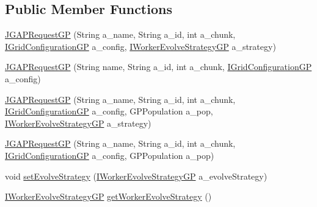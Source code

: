\subsection*{Public Member Functions}
\begin{DoxyCompactItemize}
\item 
\hyperlink{classorg_1_1jgap_1_1distr_1_1grid_1_1gp_1_1_j_g_a_p_request_g_p_a02c03575aab60b0a8100308c916efdc9}{J\-G\-A\-P\-Request\-G\-P} (String a\-\_\-name, String a\-\_\-id, int a\-\_\-chunk, \hyperlink{interfaceorg_1_1jgap_1_1distr_1_1grid_1_1gp_1_1_i_grid_configuration_g_p}{I\-Grid\-Configuration\-G\-P} a\-\_\-config, \hyperlink{interfaceorg_1_1jgap_1_1distr_1_1grid_1_1gp_1_1_i_worker_evolve_strategy_g_p}{I\-Worker\-Evolve\-Strategy\-G\-P} a\-\_\-strategy)
\item 
\hyperlink{classorg_1_1jgap_1_1distr_1_1grid_1_1gp_1_1_j_g_a_p_request_g_p_a134870375b9ef654b7f50c7ddd283c67}{J\-G\-A\-P\-Request\-G\-P} (String name, String a\-\_\-id, int a\-\_\-chunk, \hyperlink{interfaceorg_1_1jgap_1_1distr_1_1grid_1_1gp_1_1_i_grid_configuration_g_p}{I\-Grid\-Configuration\-G\-P} a\-\_\-config)
\item 
\hyperlink{classorg_1_1jgap_1_1distr_1_1grid_1_1gp_1_1_j_g_a_p_request_g_p_a01091ecbec4aacf0d3ca8c3abaf9575a}{J\-G\-A\-P\-Request\-G\-P} (String a\-\_\-name, String a\-\_\-id, int a\-\_\-chunk, \hyperlink{interfaceorg_1_1jgap_1_1distr_1_1grid_1_1gp_1_1_i_grid_configuration_g_p}{I\-Grid\-Configuration\-G\-P} a\-\_\-config, G\-P\-Population a\-\_\-pop, \hyperlink{interfaceorg_1_1jgap_1_1distr_1_1grid_1_1gp_1_1_i_worker_evolve_strategy_g_p}{I\-Worker\-Evolve\-Strategy\-G\-P} a\-\_\-strategy)
\item 
\hyperlink{classorg_1_1jgap_1_1distr_1_1grid_1_1gp_1_1_j_g_a_p_request_g_p_a2d906bea212b3ead43ac86c5bce543bc}{J\-G\-A\-P\-Request\-G\-P} (String a\-\_\-name, String a\-\_\-id, int a\-\_\-chunk, \hyperlink{interfaceorg_1_1jgap_1_1distr_1_1grid_1_1gp_1_1_i_grid_configuration_g_p}{I\-Grid\-Configuration\-G\-P} a\-\_\-config, G\-P\-Population a\-\_\-pop)
\item 
void \hyperlink{classorg_1_1jgap_1_1distr_1_1grid_1_1gp_1_1_j_g_a_p_request_g_p_aa383bac5359580a0fa62b7ad6d337a07}{set\-Evolve\-Strategy} (\hyperlink{interfaceorg_1_1jgap_1_1distr_1_1grid_1_1gp_1_1_i_worker_evolve_strategy_g_p}{I\-Worker\-Evolve\-Strategy\-G\-P} a\-\_\-evolve\-Strategy)
\item 
\hyperlink{interfaceorg_1_1jgap_1_1distr_1_1grid_1_1gp_1_1_i_worker_evolve_strategy_g_p}{I\-Worker\-Evolve\-Strategy\-G\-P} \hyperlink{classorg_1_1jgap_1_1distr_1_1grid_1_1gp_1_1_j_g_a_p_request_g_p_a47ba61242b94228a5787db102124e241}{get\-Worker\-Evolve\-Strategy} ()

\end{DoxyCompactItemize}
